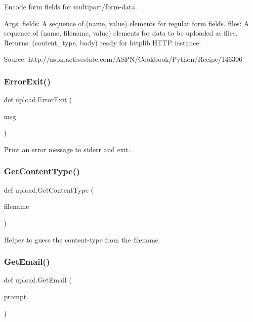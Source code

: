 \begin{DoxyVerb}Encode form fields for multipart/form-data.

Args:
  fields: A sequence of (name, value) elements for regular form fields.
  files: A sequence of (name, filename, value) elements for data to be
         uploaded as files.
Returns:
  (content_type, body) ready for httplib.HTTP instance.

Source:
  http://aspn.activestate.com/ASPN/Cookbook/Python/Recipe/146306
\end{DoxyVerb}
 \mbox{\label{namespaceupload_adea53186a1d73e92cc839b7c35c2c044}} 
\subsubsection{\texorpdfstring{Error\+Exit()}{ErrorExit()}}
{\footnotesize\ttfamily def upload.\+Error\+Exit (\begin{DoxyParamCaption}\item[{}]{msg }\end{DoxyParamCaption})}

\begin{DoxyVerb}Print an error message to stderr and exit.\end{DoxyVerb}
 \mbox{\label{namespaceupload_a753a004706d964335ad218628e07b063}} 
\subsubsection{\texorpdfstring{Get\+Content\+Type()}{GetContentType()}}
{\footnotesize\ttfamily def upload.\+Get\+Content\+Type (\begin{DoxyParamCaption}\item[{}]{filename }\end{DoxyParamCaption})}

\begin{DoxyVerb}Helper to guess the content-type from the filename.\end{DoxyVerb}
 \mbox{\label{namespaceupload_a4f169469a6d43221ebd38cfd546484e1}} 
\subsubsection{\texorpdfstring{Get\+Email()}{GetEmail()}}
{\footnotesize\ttfamily def upload.\+Get\+Email (\begin{DoxyParamCaption}\item[{}]{prompt }\end{DoxyParamCaption})}


